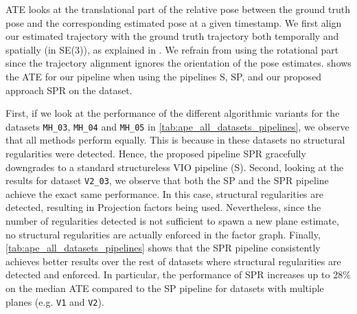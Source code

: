 \label{ssec:absolute_pose_error}
ATE looks at the translational part of the relative pose between the ground truth pose and the corresponding estimated pose at a given timestamp.
We first align our estimated trajectory with the ground truth trajectory both temporally and spatially (in SE(3)), as explained in \cite[Sec. 4.2.1]{RosinolMT}.
We refrain from using the rotational part since the trajectory alignment ignores the orientation of the pose estimates.
 shows the ATE for our pipeline when using the pipelines S, SP, and our proposed approach SPR on the \Euroc dataset.

First, if we look at the performance of the different algorithmic variants for the datasets \texttt{MH\_03}, \texttt{MH\_04} and \texttt{MH\_05} in \cref{tab:ape_all_datasets_pipelines}, we observe that all methods perform equally.
This is because in these datasets no structural regularities were detected.
Hence, the proposed pipeline SPR gracefully downgrades to a standard structureless VIO pipeline (S).
Second, looking at the results
 for dataset \texttt{V2\_03}, we observe that both the SP and the SPR pipeline achieve the exact same performance.
In this case, structural regularities are detected, resulting in Projection factors being used.
Nevertheless, since the number of regularities detected is not sufficient to spawn a new plane estimate,
no structural regularities are actually enforced in the factor graph.
Finally, \cref{tab:ape_all_datasets_pipelines} shows that the SPR pipeline consistently achieves better results over the rest of datasets where structural regularities are detected and enforced.
In particular, the performance of SPR increases up to 28\% on the median ATE compared to the SP pipeline for datasets with multiple planes (e.g. \texttt{V1} and \texttt{V2}).




